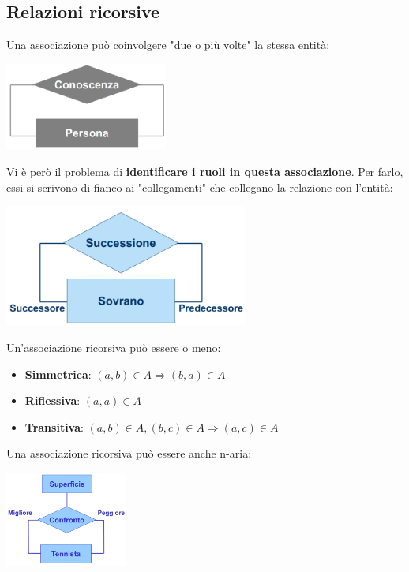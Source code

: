 \documentclass[12pt]{article}
\begin{document}
\subsection{Relazioni ricorsive}
Una associazione può coinvolgere "due o più volte" la stessa entità:
\begin{center}
    \includegraphics[width = 0.40\textwidth]{Images/29.PNG}
\end{center}
Vi è però il problema di \textbf{identificare i ruoli in questa associazione}.
Per farlo, essi si scrivono di fianco ai "collegamenti" che collegano la relazione con l'entità:
\begin{center}
    \includegraphics[width = 0.60\textwidth]{Images/30.PNG}
\end{center}
\newpage
\noindent
Un'associazione ricorsiva può essere o meno:
\begin{itemize}
    \item \textbf{Simmetrica}: $(a,b) \in A \Rightarrow (b,a) \in A$
    \item \textbf{Riflessiva}: $(a,a) \in A$
    \item \textbf{Transitiva}: $(a,b) \in A, (b,c) \in A \Rightarrow (a,c) \in A$
\end{itemize}
Una associazione ricorsiva può essere anche n-aria:
\begin{center}
    \includegraphics[width = 0.30\textwidth]{Images/31.PNG}
\end{center}
\end{document}
